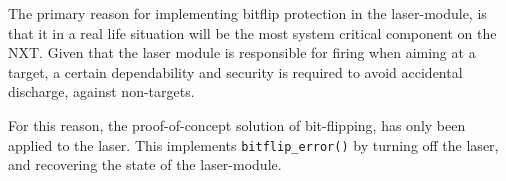 The primary reason for implementing bitflip protection in the laser-module, is that it in a real life situation will be the most system critical component on the NXT.
Given that the laser module is responsible for firing when aiming at a target, a certain dependability and security is required to avoid accidental discharge, against non-targets.

For this reason, the proof-of-concept solution of bit-flipping, has only been applied to the laser.
This implements \texttt{bitflip\_error()} by turning off the laser, and recovering the state of the laser-module.
